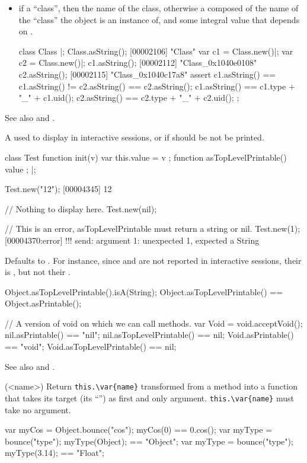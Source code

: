 \begin{urbiscriptapi}
\begin{itemize}
\item if \this a ``class'', then the name of the class, otherwise a
   composed of the name of the ``class'' the object is an
  instance of, and some integral value that depends on \this.
\begin{urbiscript}
class Class {}|;
Class.asString();
[00002106] "Class"
var c1 = Class.new()|; var c2 = Class.new()|;
c1.asString();
[00002112] "Class_0x1040e0108"
c2.asString();
[00002115] "Class_0x1040c17a8"
assert
{
  c1.asString() == c1.asString() != c2.asString() == c2.asString();
  c1.asString() == c1.type + "_" + c1.uid();
  c2.asString() == c2.type + "_" + c2.uid();
};
\end{urbiscript}
\end{itemize}
  See also  and .


\item[asTopLevelPrintable]%
  A  used to display \this in interactive sessions, or
   if \this should be not be printed.
\begin{urbiscript}
class Test
{
  function init(v) { var this.value = v };
  function asTopLevelPrintable() { value };
}|;

Test.new("12");
[00004345] 12

// Nothing to display here.
Test.new(nil);

// This is an error, asTopLevelPrintable must return a string or nil.
Test.new(1);
[00004370:error] !!! send: argument 1: unexpected 1, expected a String
\end{urbiscript}

  Defaults to .  For instance, since 
  and  are not reported in interactive sessions, their
   is , but not their
  .
\begin{urbiassert}
Object.asTopLevelPrintable().isA(String);
Object.asTopLevelPrintable() == Object.asPrintable();

// A version of void on which we can call methods.
var Void = void.acceptVoid();
 nil.asPrintable() == "nil";   nil.asTopLevelPrintable() == nil;
Void.asPrintable() == "void"; Void.asTopLevelPrintable() == nil;
\end{urbiassert}

  See also  and .


\item[bounce](<name>)%
  Return \lstinline|this.\var{name}| transformed from a method into a
  function that takes its target (its ``\this'') as first
  and only argument.  \lstinline|this.\var{name}| must take no
  argument.
\begin{urbiassert}
{ var myCos = Object.bounce("cos"); myCos(0) }   == 0.cos();
{ var myType = bounce("type"); myType(Object); } == "Object";
{ var myType = bounce("type"); myType(3.14); }   == "Float";
\end{urbiassert}



\end{urbiscriptapi}
